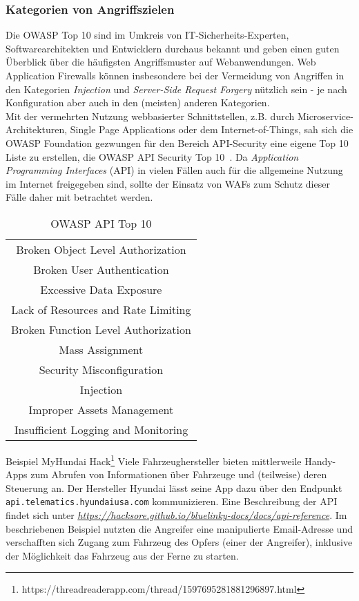\subsubsection{Kategorien von Angriffszielen}

Die OWASP Top 10 sind im Umkreis von IT-Sicherheits-Experten, Softwarearchitekten und Entwicklern durchaus bekannt und geben einen guten Überblick über die häufigsten Angriffsmuster auf Webanwendungen. Web Application Firewalls können insbesondere bei der Vermeidung von Angriffen in den Kategorien \emph{Injection} und \emph{Server-Side Request Forgery} nützlich sein - je nach Konfiguration aber auch in den (meisten) anderen Kategorien.\\

Mit der vermehrten Nutzung webbasierter Schnittstellen, z.B. durch Microservice-Architekturen, Single Page Applications oder dem Internet-of-Things, sah sich die OWASP Foundation gezwungen für den Bereich API-Security eine eigene Top 10 Liste zu erstellen, die OWASP API Security Top 10~\cite{owaspapi10}. Da \emph{Application Programming Interfaces} (API) in vielen Fällen auch für die allgemeine Nutzung im Internet freigegeben sind, sollte der Einsatz von WAFs zum Schutz dieser Fälle daher mit betrachtet werden. 

\begin{table}[ht]
    \centering
    \begin{tabular}{|c|}
    \hline
         Broken Object Level Authorization   \\
         Broken User Authentication  \\
         Excessive Data Exposure  \\
         Lack of Resources and Rate Limiting  \\
         Broken Function Level Authorization  \\
         Mass Assignment  \\
         Security Misconfiguration  \\
         Injection  \\
         Improper Assets Management  \\
         Insufficient Logging and Monitoring  \\
         \hline
    \end{tabular}
    \caption{OWASP API Top 10}
    \label{tab:owaspapitop10}
\end{table}

\textcolor{bhtGray}{ Beispiel MyHundai Hack\footnote{https://threadreaderapp.com/thread/1597695281881296897.html}} Viele Fahrzeughersteller bieten mittlerweile Handy-Apps zum Abrufen von Informationen über Fahrzeuge und (teilweise) deren Steuerung an. Der Hersteller Hyundai lässt seine App dazu über den Endpunkt \texttt{api.telematics.hyundaiusa.com} kommunizieren. Eine Beschreibung der API findet sich unter \emph{\url{https://hacksore.github.io/bluelinky-docs/docs/api-reference}}. Im beschriebenen Beispiel nutzten die Angreifer eine manipulierte Email-Adresse und verschafften sich Zugang zum Fahrzeug des Opfers (einer der Angreifer), inklusive der Möglichkeit das Fahrzeug aus der Ferne zu starten. \\

